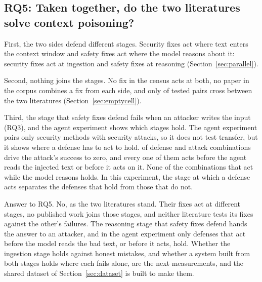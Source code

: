 \subsection{RQ5: Taken together, do the two literatures solve context poisoning?}
\label{sec:together}

First, the two sides defend different stages. Security fixes act where text
enters the context window and safety fixes act where the model reasons about
it: \NDefPtIngestionSec{} security fixes act at ingestion and
\NDefPtReasoningSafety{} safety fixes at reasoning
(Section~\ref{sec:parallel}).

Second, nothing joins the stages. No fix in the census acts at both, no paper
in the corpus combines a fix from each side, and only
\NCrossCommunityPairs{} of \NPureRegimePairs{} tested pairs cross between
the two literatures (Section~\ref{sec:emptycell}).

Third, the stage that safety fixes defend fails when an attacker writes the
input (RQ3), and the agent experiment shows which stages hold.
The agent experiment pairs only security methods with security attacks, so
it does not test transfer, but it shows where a defense has to act to hold.
\NAgentHolds{} of \NAgentConditions{} defense and attack combinations drive
the attack's success to zero, and every one of them acts before the agent
reads the injected text or before it acts on it. None of the
\NAgentTriedReasoning{} combinations that act while the model reasons holds.
In this experiment, the stage at which a defense acts separates the defenses
that hold from those that do not.

Answer to RQ5. No, as the two literatures stand. Their fixes act at
different stages, no published work joins those stages, and neither
literature tests its fixes against the other's failures. The reasoning stage
that safety fixes defend hands the answer to an attacker, and in the agent
experiment only defenses that act before the model reads the bad text, or
before it acts, hold. Whether the ingestion stage holds against honest
mistakes, and whether a system built from both stages holds where each fails
alone, are the next measurements, and the shared dataset of
Section~\ref{sec:dataset} is built to make them.
